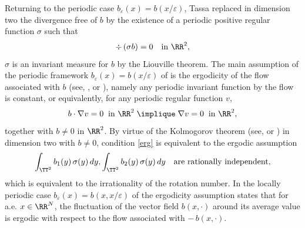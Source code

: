 Returning to the periodic case $b_\varepsilon(x)=b(x/\varepsilon)$, Tassa \cite{Tas} replaced in dimension two the divergence free of $b$ by the existence of a periodic positive regular function $\sigma$ such that
\begin{equation}\label{divb}
\div\,(\sigma b)=0\quad\mbox{in }\RR^2,
\end{equation}
\ie $\sigma$ is an invariant measure for $b$ by the Liouville theorem.
The main assumption of the periodic framework $b_\varepsilon(x)=b(x/\varepsilon)$ of \cite{Bre,HoXi,Tas} is the ergodicity of the flow associated with $b$ (see, \eg \cite[Lect.\,1]{Sin}, or \cite[Chap.\,II, \S\,5]{ReSi}), namely any periodic invariant function by the flow is constant, or equivalently, for any periodic regular function $v$,
\begin{equation}\label{erg}
b\cdot\nabla v=0\;\;\mbox{in }\RR^2\;\implique\;\nabla v=0\;\;\mbox{in }\RR^2,
\end{equation}
together with $b\neq 0$ in $\RR^2$. By virtue of the Kolmogorov theorem (see, \eg \cite[Lect.\,11]{Sin} or \cite[\S 2]{Tas}) in dimension two with $b\neq 0$, condition \eqref{erg} is equivalent to the ergodic assumption
\begin{equation}\label{birr}
\int_{\TT^2}b_1(y)\,\sigma(y)\,dy,\int_{\TT^2}b_2(y)\,\sigma(y)\,dy\quad\mbox{are rationally independent},
\end{equation}
which is equivalent to the irrationality of the rotation number.
In the locally periodic case $b_\varepsilon(x)=b(x,x/\varepsilon)$ of \cite[\S 8]{Gol1} the ergodicity assumption states that for a.e. $x\in\RR^N$, the fluctuation of the vector field $b(x,\cdot)$ around its average value is ergodic with respect to the flow associated with $-\,b(x,\cdot)$.

